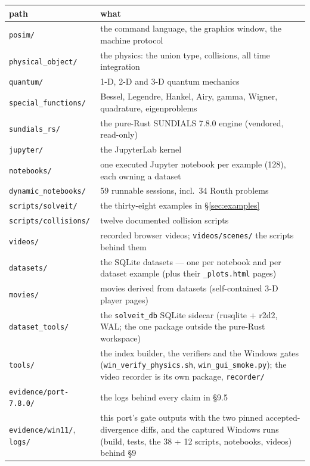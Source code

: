 \documentclass[11pt]{article}
\newcommand{\code}[1]{\texttt{#1}}
\begin{document}
\begin{center}
\begin{tabular}{p{4.4cm}p{10.2cm}}
\textbf{path} & \textbf{what}\\\hline
\code{posim/} & the command language, the graphics window, the machine protocol\\
\code{physical\_object/} & the physics: the union type, collisions, all time integration\\
\code{quantum/} & 1-D, 2-D and 3-D quantum mechanics\\
\code{special\_functions/} & Bessel, Legendre, Hankel, Airy, gamma, Wigner, quadrature, eigenproblems\\
\code{sundials\_rs/} & the pure-Rust SUNDIALS 7.8.0 engine (vendored, read-only)\\
\code{jupyter/} & the JupyterLab kernel\\
\code{notebooks/} & one executed Jupyter notebook per example (128), each owning a dataset\\
\code{dynamic\_notebooks/} & 59 runnable sessions, incl.\ 34 Routh problems\\
\code{scripts/solveit/} & the thirty-eight examples in \S\ref{sec:examples}\\
\code{scripts/collisions/} & twelve documented collision scripts\\
\code{videos/} & recorded browser videos; \code{videos/scenes/} the scripts behind them\\
\code{datasets/} & the SQLite datasets --- one per notebook and per dataset example (plus their \code{\_plots.html} pages)\\
\code{movies/} & movies derived from datasets (self-contained 3-D player pages)\\
\code{dataset\_tools/} & the \code{solveit\_db} SQLite sidecar (rusqlite + r2d2, WAL; the one package outside the pure-Rust workspace)\\
\code{tools/} & the index builder, the verifiers and the Windows gates (\code{win\_verify\_physics.sh}, \code{win\_gui\_smoke.py}); the video recorder is its own package, \code{recorder/}\\
\code{evidence/port-7.8.0/} & the logs behind every claim in \S9.5\\
\code{evidence/win11/}, \code{logs/} & this port's gate outputs with the two pinned accepted-divergence diffs, and the captured Windows runs (build, tests, the 38 + 12 scripts, notebooks, videos) behind \S9\\
\end{tabular}
\end{center}
\end{document}
